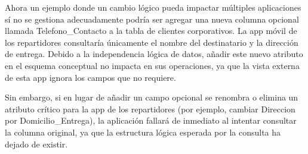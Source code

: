 Ahora un ejemplo donde un cambio lógico pueda impactar múltiples aplicaciones sí no se gestiona adecuadamente podría ser agregar una nueva columna opcional llamada Telefono\_Contacto a la tabla de clientes corporativos. La app móvil de los repartidores consultaría únicamente el nombre del destinatario y la dirección de entrega. Debido a la independencia lógica de datos, añadir este nuevo atributo en el esquema conceptual no impacta en sus operaciones, ya que la vista externa de esta app ignora los campos que no requiere.

Sin embargo, si en lugar de añadir un campo opcional se renombra o elimina un atributo crítico para la app de los repartidores (por ejemplo, cambiar Direccion por Domicilio\_Entrega), la aplicación fallará de inmediato al intentar consultar la columna original, ya que la estructura lógica esperada por la consulta ha dejado de existir.
